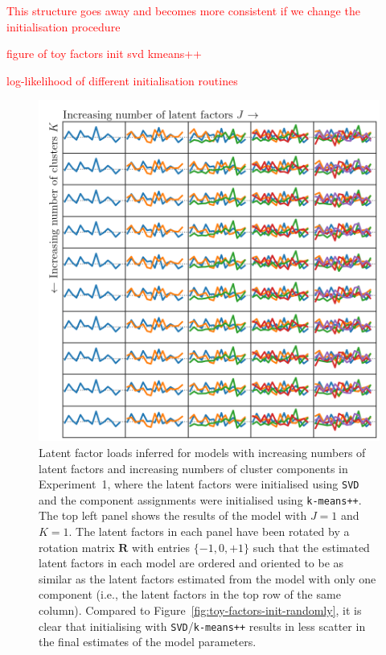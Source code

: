 \documentclass[twocolumn]{aastex61}
\newcommand{\todo}[1]{\textcolor{red}{#1}}
\newcommand{\NumLatentFactors}{J}
\newcommand{\NumComponents}{K}
\begin{document}
\todo{This structure goes away and becomes more consistent if we change the initialisation
procedure}

\todo{figure of toy factors init svd kmeans++}

\todo{log-likelihood of different initialisation routines}



\begin{figure}
	\includegraphics[width=1.0\textwidth]{experiments/toy-svd-kmeans-factors.png}
	\caption{Latent factor loads inferred for models with increasing numbers
			 of latent factors and increasing numbers of cluster components
			 in Experiment~1, where the latent factors were initialised using
			 \texttt{SVD} and the component assignments were initialised using \texttt{k-means++}.
				The top left panel shows the results of the model with
			 $\NumLatentFactors = 1$ and $\NumComponents = 1$. 
			 The latent factors in each panel have been rotated by a
			 rotation matrix $\textbf{R}$ with entries $\{-1, 0, +1\}$ such 
			 that the estimated latent factors in each model are ordered 
			 and oriented to be as similar as the latent factors estimated from
			 the model with only one component (i.e., the latent factors in the top row
			 of the same column). Compared to Figure~\ref{fig:toy-factors-init-randomly},
			 it is clear that initialising with \texttt{SVD}/\texttt{k-means++} results
			 in less scatter in the final estimates of the model parameters.}
	\label{fig:toy-factors-init-svd-and-kmeans++}
\end{figure}
\end{document}
